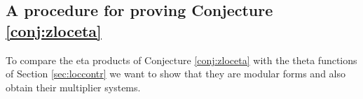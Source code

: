 \documentclass[11pt,a4paper]{amsart}
\newtheorem{proposition}[theorem]{Proposition}
\theoremstyle{definition}
\newtheorem{example}[theorem]{Example}
\newcommand{\SZ}{\mathbb{Z}}                    %
\begin{document}

\subsection{A procedure for proving Conjecture \ref{conj:zloceta}}
To compare the eta products of Conjecture \ref{conj:zloceta} with the theta functions of Section \ref{sec:loccontr} we want to show that they are modular forms and also obtain their multiplier systems.




\begin{comment}
We will be interested in unramified, but possibly half-integer weight eta products. For these we can formulate the analog of Theorem \ref{thm:etaprodmodeven}.


\begin{proposition}
	\label{prop:etaprodmod}	
	Let $f$ be an eta product as in \eqref{eq:etaproddef} such that $n=\sum_{m \mid N} a_m \in \SZ$. Let $s=\prod_{m \mid N} m^{a_m}$,  $\frac{1}{24}\sum_{m \mid N} ma_m=c/e$ and $\frac{1}{24}\sum_{m \mid N} \frac{N}{m}a_m=c_0/e_0$, both in lowest terms. Then:
	\begin{enumerate}
		\item $f(\tau)$ is a modular form of weight $n/2$ for $\Gamma_0(Ne_0)\cap\Gamma^0(e)$ with a multiplier system
		\[ \gamma(A)=\left( \frac{s}{a} \right) \left( \overline{\epsilon}_a \left(\frac{2c}{a}\right) \right)^n \]
		for $a>0$, $gcd(a,6)=1$.
		\item $F(\tau)=f(e\tau)$ is a modular form of weight $n/2$ for $\Gamma_0(Ne_0e)$ with a multiplier system defined by the Dirichlet character (mod $Ne_0e$) $\gamma(A)$ as in (1).
	\end{enumerate}
\end{proposition}
\begin{example} The Jacobi theta function from Example \ref{ex:jacobitheta} has the following description as an eta product \cite{bruinier20081}:
	\[ \theta(\tau)=\frac{\eta^5(2\tau)}{\eta^2(\tau)\eta^2(4\tau)}. \]
	Since $5\cdot 2 - 2 -2\cdot 4$ and $\frac{5}{2}-2-\frac{2}{4}$ are both zero, it is an unramified modular form of weight 1/2 for $\Gamma_0(4)$.
\end{example}
\begin{example} The function $\eta(\tau)$ is ramified both at 0 and at $i\infty$.
\end{example}
We also remark that for an unramified integer weight eta product it is known that the orders at the other cusps of $\Gamma_0(Ne_0) \cap \Gamma^0(e)$ are automatically either integral or half-integral \cite[Page 174]{gordon1989multiplicative}. This is no longer true for half-integer weight eta products, even if they are unramified. But it is true that the orders are rationals even in the half-integer weight case.


\end{comment}
\end{document}
